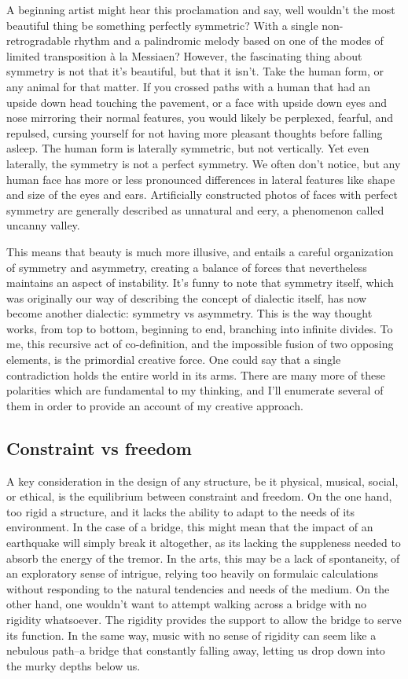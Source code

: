 \documentclass[12pt,twoside,maitrise]{dms}
\theoremstyle{definition}
\begin{document}
A beginning artist might hear this proclamation and say, well wouldn’t the most beautiful thing be something perfectly symmetric?
With a single non-retrogradable rhythm and a palindromic melody based on one of the modes of limited transposition à la Messiaen?
However, the fascinating thing about symmetry is not that it’s beautiful, but that it isn’t.
Take the human form, or any animal for that matter.
If you crossed paths with a human that had an upside down head touching the pavement, or a face with upside down eyes and nose mirroring their normal features, you would likely be perplexed, fearful, and repulsed, cursing yourself for not having more pleasant thoughts before falling asleep.
The human form is laterally symmetric, but not vertically.
Yet even laterally, the symmetry is not a perfect symmetry.
We often don’t notice, but any human face has more or less pronounced differences in lateral features like shape and size of the eyes and ears.
Artificially constructed photos of faces with perfect symmetry are generally described as unnatural and eery, a phenomenon called uncanny valley.

This means that beauty is much more illusive, and entails a careful organization of symmetry and asymmetry, creating a balance of forces that nevertheless maintains an aspect of instability.
It’s funny to note that symmetry itself, which was originally our way of describing the concept of dialectic itself, has now become another dialectic: symmetry vs asymmetry.
This is the way thought works, from top to bottom, beginning to end, branching into infinite divides.
To me, this recursive act of co-definition, and the impossible fusion of two opposing elements, is the primordial creative force.
One could say that a single contradiction holds the entire world in its arms.
There are many more of these polarities which are fundamental to my thinking, and I’ll enumerate several of them in order to provide an account of my creative approach.

\subsection{Constraint vs freedom}

A key consideration in the design of any structure, be it physical, musical, social, or ethical, is the equilibrium between constraint and freedom.
On the one hand, too rigid a structure, and it lacks the ability to adapt to the needs of its environment.
In the case of a bridge, this might mean that the impact of an earthquake will simply break it altogether, as its lacking the suppleness needed to absorb the energy of the tremor.
In the arts, this may be a lack of spontaneity, of an exploratory sense of intrigue, relying too heavily on formulaic calculations without responding to the natural tendencies and needs of the medium.
On the other hand, one wouldn't want to attempt walking across a bridge with no rigidity whatsoever.
The rigidity provides the support to allow the bridge to serve its function.
In the same way, music with no sense of rigidity can seem like a nebulous path--a bridge that constantly falling away, letting us drop down into the murky depths below us.
\end{document}
